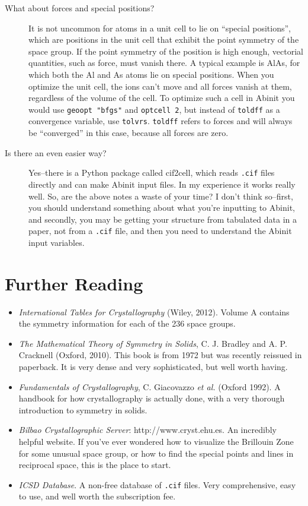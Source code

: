 \documentclass{article}
\begin{document}
\begin{description}
\item[What about forces and special positions?]It is not uncommon for atoms in a unit cell to lie on ``special positions'', which
are positions in the unit cell that exhibit the point symmetry of the space group. If the point symmetry of the position is
high enough, vectorial quantities, such as force, must vanish there. A typical example is AlAs, for which both the Al and As
atoms lie on special positions. When you optimize the unit cell, the ions can't move and all forces vanish at them, regardless
of the volume of the cell. To optimize such a cell in {\sc Abinit} you would use {\tt geoopt "bfgs"} and {\tt optcell 2}, but instead
of {\tt toldff} as a convergence variable, use {\tt tolvrs}. {\tt toldff} refers to forces and will always be ``converged'' in this
case, because all forces are zero.

\item[Is there an even easier way?] Yes--there is a {\sc Python} package called {\sc cif2cell}, which reads {\tt .cif} files
directly and can make {\sc Abinit} input files. In my experience it works really well. So, are the above notes a waste of your
time? I don't think so--first, you should understand something about what you're inputting to {\sc Abinit}, and secondly, you may 
be getting your structure from tabulated data in a paper, not from a {\tt .cif} file, and then you need to understand the
{\sc Abinit} input variables.

\end{description}

\section{Further Reading}
\begin{itemize}
\item {\em International Tables for Crystallography} (Wiley, 2012). Volume A contains the symmetry information for each of the
236 space groups.

\item {\em The Mathematical Theory of Symmetry in Solids}, C. J. Bradley and A. P. Cracknell (Oxford, 2010). This book is from
1972 but was recently reissued in paperback. It is very dense and very sophisticated, but well worth having.

\item {\em Fundamentals of Crystallography}, C. Giacovazzo {\em et al.} (Oxford 1992). A handbook for how crystallography is
actually done, with a very thorough introduction to symmetry in solids.

\item {\em Bilbao Crystallographic Server}: http://www.cryst.ehu.es. An incredibly helpful website. If you've ever wondered how
to visualize the Brillouin Zone for some unusual space group, or how to find the special points and lines in reciprocal space,
this is the place to start.

\item {\em ICSD Database}. A non-free database of {\tt .cif} files. Very comprehensive, easy to use, and well worth the subscription
fee.

\end{itemize}
\end{document}
